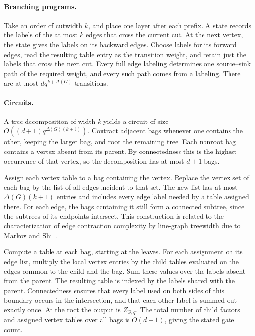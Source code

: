 \paragraph{Branching programs.}
Take an order of cutwidth \(k\), and place one layer after each
prefix. A state records the labels of the at most \(k\) edges that
cross the current cut. At the next vertex, the state gives the labels
on its backward edges. Choose labels for its forward edges, read the
resulting table entry as the transition weight, and retain just the
labels that cross the next cut. Every full edge labeling determines
one source--sink path of the required weight, and every such path
comes from a labeling. There are at most \(dq^{k+\Delta(G)}\)
transitions.

\paragraph{Circuits.}
A tree decomposition of width \(k\) yields a circuit of size
\(O((d+1)q^{\Delta(G)(k+1)})\). Contract adjacent bags whenever one
contains the other, keeping the larger bag, and root the remaining
tree. Each nonroot bag contains a vertex absent from its parent.
By connectedness this is the highest occurrence of that vertex,
so the decomposition has at most \(d+1\) bags.

Assign each vertex table to a bag containing the vertex. Replace
the vertex set of each bag by the list of all edges incident to that
set. The new list has at most \(\Delta(G)(k+1)\) entries and includes
every edge label needed by a table assigned there. For each edge,
the bags containing it still form a connected subtree, since the
subtrees of its endpoints intersect. This construction is related to
the characterization of edge contraction complexity by line-graph
treewidth due to Markov and Shi~\cite{MarkovShi}.

Compute a table at each bag, starting at the leaves. For each assignment
on its edge list, multiply the local vertex entries by the child
tables evaluated on the edges common to the child and the bag. Sum
these values over the labels absent from the parent. The resulting
table is indexed by the labels shared with the parent. Connectedness
ensures that every label used on both sides of this boundary occurs
in the intersection, and that each other label is summed out exactly
once. At the root the output is \(Z_{G,q}\). The total number of
child factors and assigned vertex tables over all bags is \(O(d+1)\),
giving the stated gate count.


